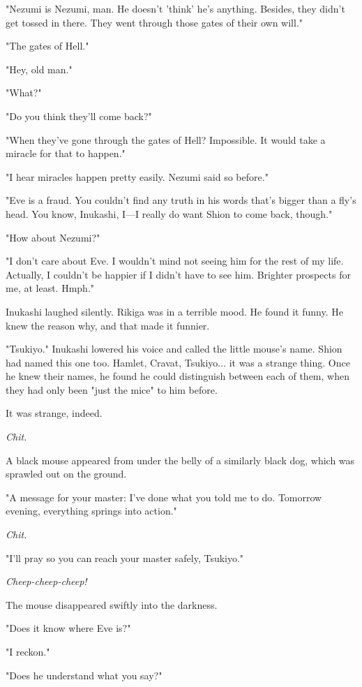 "Nezumi is Nezumi, man. He doesn't 'think' he's anything. Besides, they
didn't get tossed in there. They went through those gates of their own
will."

"The gates of Hell."

"Hey, old man."

"What?"

"Do you think they'll come back?"

"When they've gone through the gates of Hell? Impossible. It would take
a miracle for that to happen."

"I hear miracles happen pretty easily. Nezumi said so before."

"Eve is a fraud. You couldn't find any truth in his words that's bigger
than a fly's head. You know, Inukashi, I---I really do want Shion to come
back, though."

"How about Nezumi?"

"I don't care about Eve. I wouldn't mind not seeing him for the rest of
my life. Actually, I couldn't be happier if I didn't have to see him.
Brighter prospects for me, at least. Hmph."

Inukashi laughed silently. Rikiga was in a terrible mood. He found it
funny. He knew the reason why, and that made it funnier.

"Tsukiyo." Inukashi lowered his voice and called the little mouse's
name. Shion had named this one too. Hamlet, Cravat, Tsukiyo... it was a
strange thing. Once he knew their names, he found he could distinguish
between each of them, when they had only been "just the mice" to him
before.

It was strange, indeed.

\emph{Chit.}

A black mouse appeared from under the belly of a similarly black dog,
which was sprawled out on the ground.

"A message for your master: I've done what you told me to do. Tomorrow
evening, everything springs into action."

\emph{Chit.}

"I'll pray so you can reach your master safely, Tsukiyo."

\emph{Cheep-cheep-cheep!}

The mouse disappeared swiftly into the darkness.

"Does it know where Eve is?"

"I reckon."

"Does he understand what you say?"

